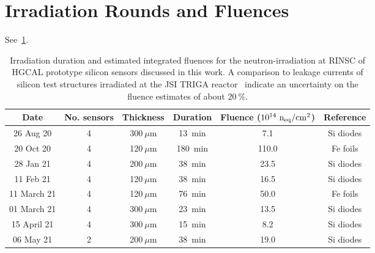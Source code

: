 \section{Irradiation Rounds and Fluences}
\label{appendix:irrad_rounds}
See~\ref{table:irrads}.
\begin{table}[h]
	\centering
	\caption{Irradiation duration and estimated integrated fluences for the neutron-irradiation at RINSC of HGCAL prototype silicon sensors discussed in this work.
	A comparison to leakage currents of silicon test structures irradiated at the JSI TRIGA reactor~\cite{Radulovic:2284353} indicate an uncertainty on the fluence estimates of about 20$~\%$.
	}
	\label{table:irrads}	
	\begin{tabular}{c|ccccc}
		\textbf{Date} & \textbf{No. sensors} & \textbf{Thickness} & \textbf{Duration} & \textbf{Fluence ($10^{14}~\mathrm{n_{eq}}/\mathrm{cm}^{2}$)} & \textbf{Reference} \\
		\hline
		26 Aug 20 & 4 & 300$~\mu$m & \SI{13}{\minute} & 7.1 & Si diodes \\
		20 Oct 20 & 4 & 120$~\mu$m & \SI{180}{\minute} & 110.0 & Fe foils \\
		28 Jan 21 & 4 & 200$~\mu$m & \SI{38}{\minute} & 23.5 & Si diodes \\
		11 Feb 21 & 4 & 120$~\mu$m & \SI{38}{\minute} & 16.5 & Si diodes \\
		11 March 21 & 4 & 120$~\mu$m & \SI{76}{\minute} & 50.0 & Fe foils \\
		01 March 21 & 4 & 300$~\mu$m & \SI{23}{\minute} & 13.5 & Si diodes \\
		15 April 21 & 4 & 300$~\mu$m & \SI{15}{\minute} & 8.2 & Si diodes \\
		06 May 21 & 2 & 200$~\mu$m & \SI{38}{\minute} & 19.0 & Si diodes \\
		\hline
	\end{tabular}
\end{table}


